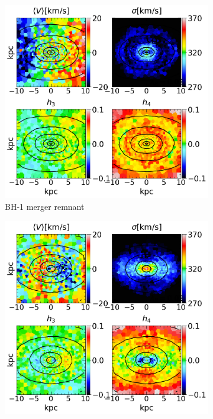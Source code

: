 \documentclass[english, oneside]{HYgradu}
\begin{document}
\begin{figure}
	\centering
	\begin{subfigure}[b]{0.49\textwidth}
		\includegraphics[width=\textwidth]{BH_0.png}
		\caption{BH-1 merger remnant}
	\end{subfigure}
	\begin{subfigure}[b]{0.49\textwidth}
		\includegraphics[width=\textwidth]{BH_6.png}

\end{subfigure}
\end{figure}
\end{document}

